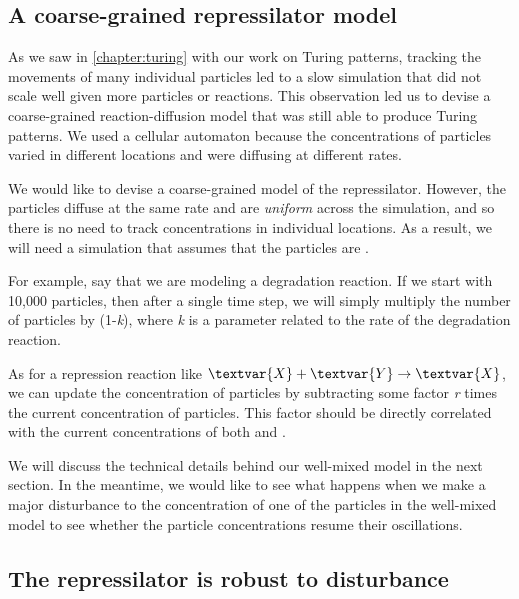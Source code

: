 \FloatBarrier
{}
\subsection{A coarse-grained repressilator model}

As we saw in \autoref{chapter:turing} with our work on Turing patterns, tracking the movements of many individual particles led to a slow simulation that did not scale well given more particles or reactions. This observation led us to devise a coarse-grained reaction-diffusion model that was still able to produce Turing patterns. We used a cellular automaton because the concentrations of particles varied in different locations and were diffusing at different rates.

We would like to devise a coarse-grained model of the repressilator. However, the particles diffuse at the same rate and are \textit{uniform} across the simulation, and so there is no need to track concentrations in individual locations. As a result, we will need a simulation that assumes that the particles are .

For example, say that we are modeling a degradation reaction. If we start with 10,000  particles, then after a single time step, we will simply multiply the number of  particles by (1-\textit{k}), where \textit{k} is a parameter related to the rate of the degradation reaction.

As for a repression reaction like $\textvar{X} + \textvar{Y} \rightarrow \textvar{X}$, we can update the concentration of  particles by subtracting some factor \textit{r} times the current concentration of  particles. This factor should be directly correlated with the current concentrations of both  and .

We will discuss the technical details behind our well-mixed model in the next section. In the meantime, we would like to see what happens when we make a major disturbance to the concentration of one of the particles in the well-mixed model to see whether the particle concentrations resume their oscillations.


\FloatBarrier
{}
\subsection{The repressilator is robust to disturbance}

